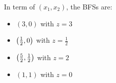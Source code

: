 \documentclass[a4paper, 10pt]{article}
\begin{document}
\begin{solution}
In term of \( (x_1, x_2) \), the BFSs are:
\begin{itemize}
    \item \( (3, 0) \) with \( z = 3 \)
    \item \( \left( \frac{1}{2}, 0 \right) \) with \( z = \frac{1}{2} \)
    \item \( \left( \frac{5}{2}, \frac{1}{2} \right) \) with \( z = 2 \)
    \item \( (1, 1) \) with \( z = 0 \)
\end{itemize}
\end{solution}

\newpage

\end{document}
